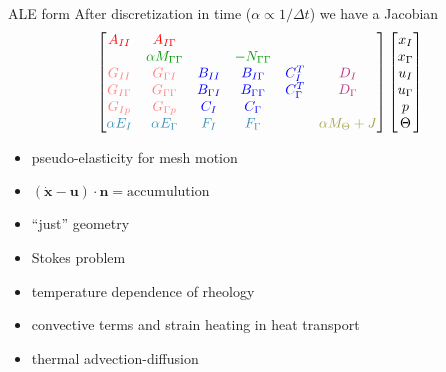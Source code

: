 \newcommand{\colorA}[1]{{\color{red} #1}}
\newcommand{\colorB}[1]{{\color{green!60!black} #1}}
\newcommand{\colorC}[1]{{\color{blue} #1}}
\newcommand{\colorD}[1]{{\color{magenta!70!black} #1}}
\newcommand{\colorE}[1]{{\color{cyan!70!black} #1}}
\newcommand{\colorF}[1]{{\color{yellow!60!black} #1}}
\newcommand{\colorG}[1]{{\color{red!50!white} #1}}

\begin{frame}{ALE form}
  After discretization in time ($\alpha \propto 1/\Delta t$) we have a Jacobian
  \begin{equation*}
    \begin{bmatrix}
      \colorA{A_{II}} & \colorA{A_{I\Gamma}}             &                       &                             &                     &   \\
      & \colorB{\alpha M_{\Gamma\Gamma}} &                       & \colorB{- N_{\Gamma\Gamma}} &                       &  \\
      \colorG{G_{II}}      & \colorG{G_{\Gamma I}} & \colorC{B_{II}}       & \colorC{B_{I\Gamma}}        & \colorC{C_{I}^T}    & \colorD{D_I} \\
      \colorG{G_{I\Gamma}} &        \colorG{G_{\Gamma\Gamma}}                          & \colorC{B_{\Gamma I}} & \colorC{B_{\Gamma\Gamma}}   & \colorC{C_{\Gamma}^T} & \colorD{D_\Gamma} \\
      \colorG{G_{Ip}}        &  \colorG{G_{\Gamma p}}                                & \colorC{C_{I}}        & \colorC{C_{\Gamma}}         &                   & \\
      \colorE{\alpha E_I}    & \colorE{\alpha E_\Gamma} & \colorE{F_I} & \colorE{F_\Gamma} & & \colorF{\alpha M_\Theta + J}
    \end{bmatrix}
    \begin{bmatrix}
      x_I \\ x_\Gamma \\ u_I \\ u_\Gamma \\ p \\ \Theta
    \end{bmatrix}
  \end{equation*}
  \begin{itemize}
  \item \colorA{pseudo-elasticity for mesh motion}
  \item \colorB{$(\dot{\bm x} - \bm u)\cdot \bm n = \text{accumulution}$}
  \item \colorG{``just'' geometry}
  \item \colorC{Stokes problem}
  \item \colorD{temperature dependence of rheology}
  \item \colorE{convective terms and strain heating in heat transport}
  \item \colorF{thermal advection-diffusion}
  \end{itemize}
\end{frame}
